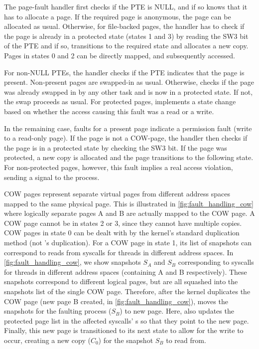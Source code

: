 \documentclass[letterpaper,twocolumn,10pt, anonymous]{article}
\begin{document}
The page-fault handler first checks if the PTE is NULL, and if so 
knows that it has to allocate a page. 
If the required page is anonymous, the page can be allocated as usual.
Otherwise, for file-backed pages, the handler has to check if the 
page is already in a protected state (states 1 and 3) by reading 
the SW3 bit of the PTE and if so, transitions to the required state
and allocates a new copy. 
Pages in states 0 and 2 can be directly mapped, and subsequently
accessed.

For non-NULL PTEs, the handler checks if the PTE indicates that the 
page is present.
Non-present pages are swapped-in as usual.
Otherwise, \tiktok checks if the page was already swapped in by 
any other task and is now in a protected state.
If not, the swap proceeds as usual.
For protected pages, \tiktok implements a state change based on 
whether the access causing this fault was a read or a write.

In the remaining case, faults for a present page indicate a 
permission fault (write to a read-only page).
If the page is not a COW-page, the handler then checks if the page
is in a protected state by checking the SW3 bit.
If the page was protected, a new copy is allocated and the page 
transitions to the following state.
For non-protected pages, however, this fault implies a real access
violation, sending a signal to the process.

COW pages represent separate virtual pages from different 
address spaces mapped to the same physical page.
This is illustrated in \autoref{fig:fault_handling_cow} where 
logically separate pages A and B are actually mapped to the COW
page.
A COW page cannot be in states 2 or 3, since they cannot have multiple
\tiktok copies.
COW pages in state 0 can be dealt with by the kernel's standard
duplication method (not \tiktok's duplication).
For a COW page in state 1, its list of snapshots can correspond to 
reads from syscalls for threads in different address spaces.
In \autoref{fig:fault_handling_cow}, we show snapshots $S_A$ and 
$S_B$ corresponding to syscalls for threads in different address 
spaces (containing A and B respectively).
These snapshots correspond to different logical pages, but are 
all squashed into the snapshots list of the single COW page. 
Therefore, after the kernel duplicates the COW page (new page
B created, in \autoref{fig:fault_handling_cow}), \tiktok moves 
the snapshots for the faulting process ($S_B$) to new page.
Here, \tiktok also updates the protected page list in the 
affected syscalls' s so that they point to the 
new page.
Finally, this new page is transitioned to its next state to allow 
for the write to occur, creating a new copy ($C_0$) for the
snapshot $S_B$ to read from.
\end{document}
